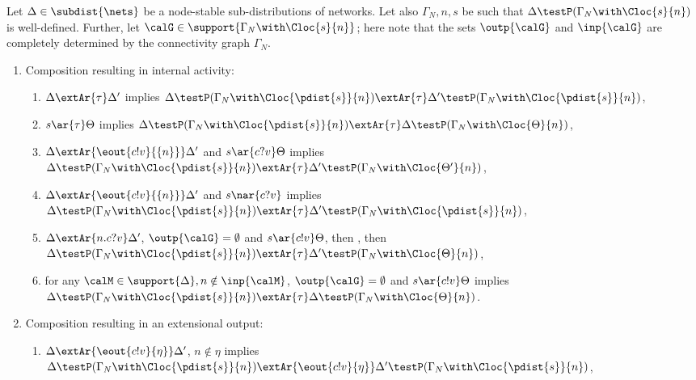 \documentclass{LMCS}
\begin{document}
\begin{prop}
\label{prop:wea.comp}
	Let $\Delta \in \subdist{\nets}$ be a 
	node-stable sub-distributions of networks. 
	Let also $\Gamma_N, n, s$ be such that $\Delta \testP (\Gamma_N \with 
	\Cloc{s}{n})$ is well-defined. Further, 
	let $\calG \in \support{\Gamma_N \with \Cloc{s}{n}}$; 
	here note that the sets $\outp{\calG}$ and $\inp{\calG}$ are 
	completely determined by the connectivity graph $\Gamma_N$.
	\begin{enumerate}\item Composition resulting in internal activity:
	\begin{enumerate}[label=(\roman*)]
\item
    $\Delta \extAr{\tau} \Delta'$ 
implies 
 $\Delta \testP (\Gamma_N \with \Cloc{\pdist{s}}{n}) \extAr{\tau}
 \Delta' \testP (\Gamma_N \with \Cloc{\pdist{s}}{n})$,

\item $s \ar{\tau} \Theta$ implies 
$\Delta \testP (\Gamma_N \with \Cloc{\pdist{s}}{n}) 
\extAr{\tau} \Delta \testP (\Gamma_N \with \Cloc{\Theta}{n})$, 

\item $\Delta \extAr{\eout{c!v}{\{n\}}} \Delta'$ and 
$s \ar{c?v} \Theta$ implies 
$\Delta \testP (\Gamma_N \with \Cloc{\pdist{s}}{n}) 
\extAr{\tau} \Delta' \testP (\Gamma_N \with \Cloc{\Theta'}{n}) $, 

\item $\Delta \extAr{\eout{c!v}{\{n\}}} \Delta'$ and 
$s \nar{c?v}$ implies 
$\Delta \testP (\Gamma_N \with \Cloc{\pdist{s}}{n}) 
\extAr{\tau} \Delta' \testP (\Gamma_N \with \Cloc{\pdist{s}}{n}) $, 

\item $\Delta \extAr{n.c?v} \Delta'$, 
$\outp{\calG} = \emptyset$ 
and $s \ar{c!v} \Theta$, then , 
then $\Delta \testP 
(\Gamma_N \with \Cloc{\pdist{s}}{n}) \extAr{\tau} \Delta' \testP 
(\Gamma_N \with \Cloc{\Theta}{n})$,

\item for any $\calM \in \support{\Delta}, n \notin \inp{\calM}$, 
$\outp{\calG} = \emptyset$ and $s \ar{c!v} \Theta$ implies 
$\Delta \testP (\Gamma_N \with \Cloc{\pdist{s}}{n}) 
\extAr{\tau} \Delta \testP (\Gamma_N \with \Cloc{\Theta}{n})$. 
\end{enumerate}

\item Composition resulting in an extensional output:
\begin{enumerate}[label=(\roman*)]
\item  $\Delta \extAr{\eout{c!v}{\eta}} \Delta'$, $n \notin \eta$ 
  implies 
  $\Delta \testP (\Gamma_N \with \Cloc{\pdist{s}}{n}) 
  \extAr{\eout{c!v}{\eta}} \Delta' \testP (\Gamma_N \with \Cloc{\pdist{s}}{n})$,


\end{enumerate}
\end{enumerate}
\end{prop}
\end{document}
